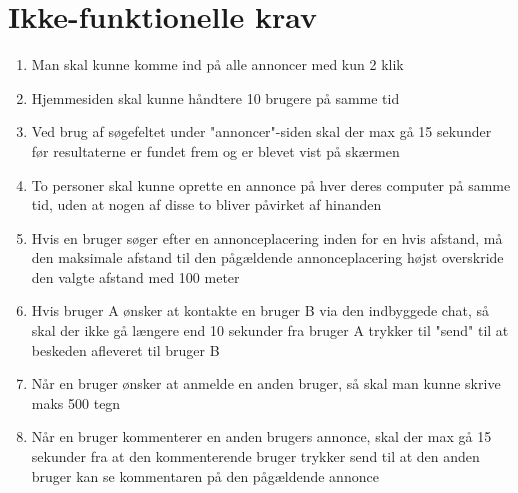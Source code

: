 \chapter{Ikke-funktionelle krav}

\begin{enumerate}
	\item Man skal kunne komme ind på alle annoncer med kun 2 klik
	
	\item Hjemmesiden skal kunne håndtere 10 brugere på samme tid
	
	\item Ved brug af søgefeltet under "annoncer"-siden skal der max gå 15 sekunder før resultaterne er fundet frem og er blevet vist på skærmen
	
	\item To personer skal kunne oprette en annonce på hver deres computer på samme tid, uden at nogen af disse to bliver påvirket af hinanden
	
	\item Hvis en bruger søger efter en annonceplacering inden for en hvis afstand, må den maksimale afstand til den pågældende annonceplacering højst overskride den valgte afstand med 100 meter
	
	\item Hvis bruger A ønsker at kontakte en bruger B via den indbyggede chat, så skal der ikke gå længere end 10 sekunder fra bruger A trykker til "send" til at beskeden afleveret til bruger B
	
	\item Når en bruger ønsker at anmelde en anden bruger, så skal man kunne skrive maks 500 tegn
	
	\item Når en bruger kommenterer en anden brugers annonce, skal der max gå 15 sekunder fra at den kommenterende bruger trykker send til at den anden bruger kan se kommentaren på den pågældende annonce
	
\end{enumerate}